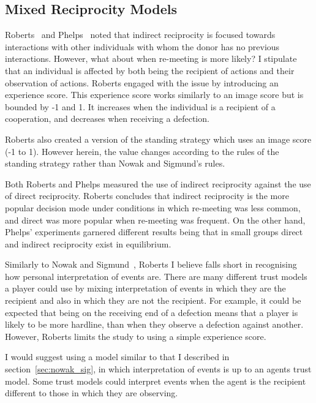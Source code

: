 \documentclass[]{final_report}
\begin{document}
\subsection{Mixed Reciprocity Models}
Roberts~\cite{evoldirindir} and Phelps~\cite{phelps_game_theoretic_analysis} noted that indirect reciprocity is focused towards interactions with other individuals with whom the donor has no previous interactions. However, what about when re-meeting is more likely? I stipulate that an individual is affected by both being the recipient of actions and their observation of actions. Roberts engaged with the issue by introducing an experience score. This experience score works similarly to an image score but is bounded by -1 and 1. It increases when the individual is a recipient of a cooperation, and decreases when receiving a defection.\par
Roberts also created a version of the standing strategy which uses an image score (-1 to 1). However herein, the value changes according to the rules of the standing strategy rather than Nowak and Sigmund's rules.\par
Both Roberts and Phelps measured the use of indirect reciprocity against the use of direct reciprocity. Roberts concludes that indirect reciprocity is the more popular decision mode under conditions in which re-meeting was less common, and direct was more popular when re-meeting was frequent. On the other hand, Phelps' experiments garnered different results being that in small groups direct and indirect reciprocity exist in equilibrium.\par
Similarly to Nowak and Sigmund~\cite{evol_indirect_image}, Roberts I believe falls short in recognising how personal interpretation of events are. There are many different trust models a player could use by mixing interpretation of events in which they are the recipient and also in which they are not the recipient. For example, it could be expected that being on the receiving end of a defection means that a player is likely to be more hardline, than when they observe a defection against another. However, Roberts limits the study to using a simple experience score.\par
I would suggest using a model similar to that I described in section~\ref{sec:nowak_sig}, in which interpretation of events is up to an agents trust model. Some trust models could interpret events when the agent is the recipient different to those in which they are observing.
\end{document}
